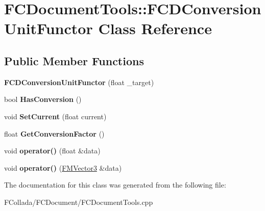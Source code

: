 \hypertarget{classFCDocumentTools_1_1FCDConversionUnitFunctor}{
\section{FCDocumentTools::FCDConversionUnitFunctor Class Reference}
\label{classFCDocumentTools_1_1FCDConversionUnitFunctor}
}
\subsection*{Public Member Functions}
\begin{DoxyCompactItemize}
\item 
\hypertarget{classFCDocumentTools_1_1FCDConversionUnitFunctor_ac9cb423a7036d946dbfaecfb83402a6f}{
{\bfseries FCDConversionUnitFunctor} (float \_\-target)}
\label{classFCDocumentTools_1_1FCDConversionUnitFunctor_ac9cb423a7036d946dbfaecfb83402a6f}

\item 
\hypertarget{classFCDocumentTools_1_1FCDConversionUnitFunctor_afa0ce9f99556c1cda9d892f8a1745db3}{
bool {\bfseries HasConversion} ()}
\label{classFCDocumentTools_1_1FCDConversionUnitFunctor_afa0ce9f99556c1cda9d892f8a1745db3}

\item 
\hypertarget{classFCDocumentTools_1_1FCDConversionUnitFunctor_aaf9ac74e073e6c4ff7effc1b1afbbc95}{
void {\bfseries SetCurrent} (float current)}
\label{classFCDocumentTools_1_1FCDConversionUnitFunctor_aaf9ac74e073e6c4ff7effc1b1afbbc95}

\item 
\hypertarget{classFCDocumentTools_1_1FCDConversionUnitFunctor_ab804adcbeb8a39d116aa0fe73a4d3d36}{
float {\bfseries GetConversionFactor} ()}
\label{classFCDocumentTools_1_1FCDConversionUnitFunctor_ab804adcbeb8a39d116aa0fe73a4d3d36}

\item 
\hypertarget{classFCDocumentTools_1_1FCDConversionUnitFunctor_ab56fdb237462072b96a54e9deaf08583}{
void {\bfseries operator()} (float \&data)}
\label{classFCDocumentTools_1_1FCDConversionUnitFunctor_ab56fdb237462072b96a54e9deaf08583}

\item 
\hypertarget{classFCDocumentTools_1_1FCDConversionUnitFunctor_abf6ec5a61dcae64596bca328a054417d}{
void {\bfseries operator()} (\hyperlink{classFMVector3}{FMVector3} \&data)}
\label{classFCDocumentTools_1_1FCDConversionUnitFunctor_abf6ec5a61dcae64596bca328a054417d}

\end{DoxyCompactItemize}


The documentation for this class was generated from the following file:\begin{DoxyCompactItemize}
\item 
FCollada/FCDocument/FCDocumentTools.cpp\end{DoxyCompactItemize}
